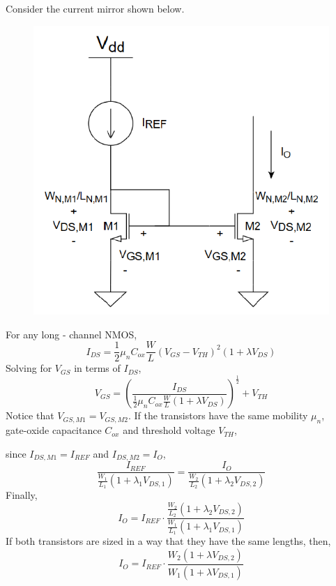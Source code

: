 \documentclass{article}
\begin{document}
\noindent Consider the current mirror shown below. 

\begin{figure}[h]
    \includegraphics[scale=0.4]{mir}
\end{figure} 

\noindent For any long - channel NMOS, 
$$I_{DS} = \frac{1}{2} \mu_{n} C_{ox} \frac{W}{L} (V_{GS}-V_{TH})^{2} (1+\lambda V_{DS})$$
Solving for $V_{GS}$ in terms of $I_{DS}$, 
\large
$$V_{GS} = \left( \frac{I_{DS}}{\frac{1}{2} \mu_{n} C_{ox} \frac{W}{L} (1+\lambda V_{DS})} \right)^{\frac{1}{2}} + V_{TH}$$
\normalsize 
Notice that $V_{GS,M1} = V_{GS,M2}$. If the transistors have the same mobility $\mu_{n}$, \\gate-oxide
capacitance $C_{ox}$ and threshold voltage $V_{TH}$,

\vspace{10pt}
\noindent since $I_{DS,M1} = I_{REF}$ and $I_{DS,M2} = I_{O}$, 
\large 
$$\frac{I_{REF}}{\frac{W_1}{L_1}(1+\lambda_1 V_{DS,1})} = \frac{I_{O}}{\frac{W_2}{L_2}(1+\lambda_2 V_{DS,2})}$$
\normalsize Finally, 
\large
$$I_{O} = I_{REF} \cdot \frac{\frac{W_2}{L_2}(1+\lambda_2 V_{DS,2})}{\frac{W_1}{L_1}(1+\lambda_1 V_{DS,1})}$$
If both transistors are sized in a way that they have the same lengths, then, 
$$I_{O} = I_{REF} \cdot \frac{W_{2}(1+\lambda V_{DS,2})}{W_{1}(1+\lambda V_{DS,1})}$$
\end{document}
